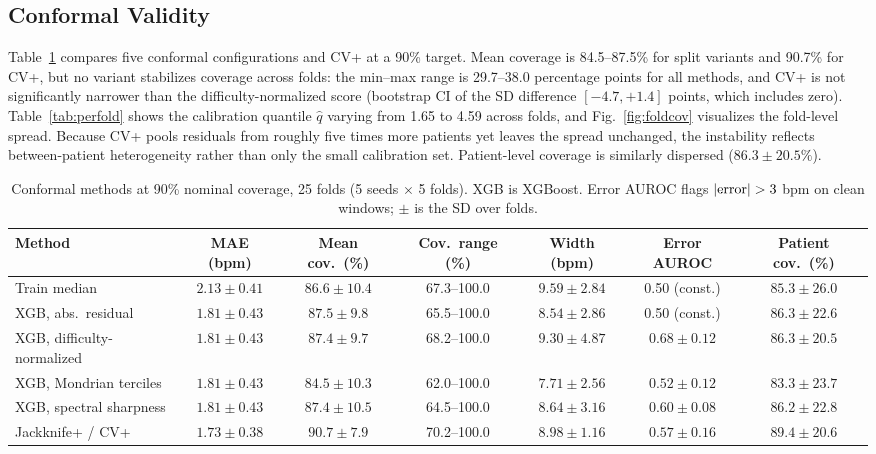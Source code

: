 \documentclass[conference]{IEEEtran}
\begin{document}
\subsection{Conformal Validity}
Table~\ref{tab:scores} compares five conformal configurations and CV+ at a 90\% target. Mean coverage is 84.5--87.5\% for split variants and 90.7\% for CV+, but no variant stabilizes coverage across folds: the min--max range is 29.7--38.0 percentage points for all methods, and CV+ is not significantly narrower than the difficulty-normalized score (bootstrap CI of the SD difference $[-4.7,+1.4]$ points, which includes zero). Table~\ref{tab:perfold} shows the calibration quantile $\hat{q}$ varying from 1.65 to 4.59 across folds, and Fig.~\ref{fig:foldcov} visualizes the fold-level spread. Because CV+ pools residuals from roughly five times more patients yet leaves the spread unchanged, the instability reflects between-patient heterogeneity rather than only the small calibration set. Patient-level coverage is similarly dispersed ($86.3\pm20.5\%$).

\begin{table}[!t]
\caption{Conformal methods at 90\% nominal coverage, 25 folds (5 seeds $\times$ 5 folds). XGB is XGBoost. Error AUROC flags $|{\rm error}|>3$ bpm on clean windows; $\pm$ is the SD over folds.}
\label{tab:scores}
\centering\footnotesize
\renewcommand{\arraystretch}{1.1}
\setlength{\tabcolsep}{3pt}
\begin{tabular}{@{}lcccccc@{}}
\toprule
\textbf{Method} & \textbf{MAE (bpm)} & \textbf{Mean cov.\ (\%)} & \textbf{Cov.\ range (\%)} & \textbf{Width (bpm)} & \textbf{Error AUROC} & \textbf{Patient cov.\ (\%)} \\
\midrule
Train median & $2.13\pm0.41$ & $86.6\pm10.4$ & 67.3--100.0 & $9.59\pm2.84$ & 0.50 (const.) & $85.3\pm26.0$ \\
XGB, abs.\ residual & $1.81\pm0.43$ & $87.5\pm9.8$ & 65.5--100.0 & $8.54\pm2.86$ & 0.50 (const.) & $86.3\pm22.6$ \\
XGB, difficulty-normalized & $1.81\pm0.43$ & $87.4\pm9.7$ & 68.2--100.0 & $9.30\pm4.87$ & $0.68\pm0.12$ & $86.3\pm20.5$ \\
XGB, Mondrian terciles & $1.81\pm0.43$ & $84.5\pm10.3$ & 62.0--100.0 & $7.71\pm2.56$ & $0.52\pm0.12$ & $83.3\pm23.7$ \\
XGB, spectral sharpness & $1.81\pm0.43$ & $87.4\pm10.5$ & 64.5--100.0 & $8.64\pm3.16$ & $0.60\pm0.08$ & $86.2\pm22.8$ \\
Jackknife+ / CV+ & $1.73\pm0.38$ & $90.7\pm7.9$ & 70.2--100.0 & $8.98\pm1.16$ & $0.57\pm0.16$ & $89.4\pm20.6$ \\
\bottomrule
\end{tabular}
\end{table}
\end{document}
